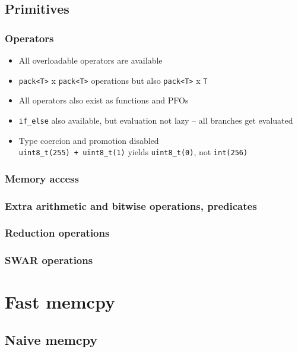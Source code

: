 \documentclass{beamer}
\begin{document}
\subsection{Primitives}

\begin{frame}
	\frametitle{Operators}
	
	\begin{itemize}
		\item All overloadable operators are available
		\item \lstinline{pack<T>} x \lstinline{pack<T>} operations but also \lstinline{pack<T>} x \lstinline{T}
		\item All operators also exist as functions and PFOs
		\item \lstinline{if_else} also available, but evaluation not lazy -- all branches get evaluated
		\item Type coercion and promotion disabled\\
		      \lstinline{uint8_t(255) + uint8_t(1)} yields \lstinline{uint8_t(0)}, not \lstinline{int(256)}
	\end{itemize}	
	
\end{frame}

\begin{frame}
	\frametitle{Memory access}
\end{frame}

\begin{frame}
	\frametitle{Extra arithmetic and bitwise operations, predicates}
\end{frame}

\begin{frame}
	\frametitle{Reduction operations}
\end{frame}

\begin{frame}
	\frametitle{SWAR operations}
\end{frame}

\section{Fast memcpy}

\subsection{Naive memcpy}

\begin{frame}
\end{frame}
\end{document}
